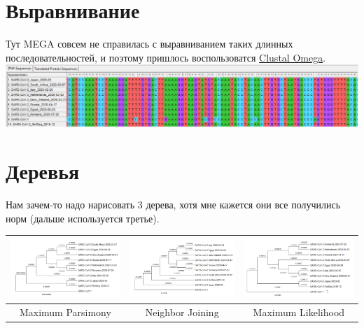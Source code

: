 \documentclass{article}
\begin{document}
  \section{Выравнивание}
  Тут MEGA совсем не справилась с выравниванием таких длинных последовательностей,
  и поэтому пришлось воспользоватся \href{http://www.clustal.org/omega/}{Clustal Omega}. \\
  \includegraphics[width=\textwidth]{aligned.png}

  \section{Деревья}
  Нам зачем-то надо нарисовать 3 дерева, хотя мне кажется они все получились норм (дальше используется третье).
  \begin{center}
    \begin{tabular}{|C|C|C|}
      \hline
      \includegraphics[width=.3\textwidth]{treeMP.png} &
      \includegraphics[width=.3\textwidth]{treeNJ.png} &
      \includegraphics[width=.3\textwidth]{fulltree.png} \\\hline
      Maximum Parsimony &
      Neighbor Joining &
      Maximum Likelihood \\\hline
    \end{tabular}
  \end{center}
\end{document}
